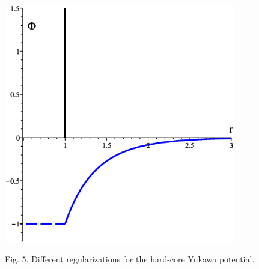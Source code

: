 \documentclass[8pt]{beamer}
\begin{document}
\begin{frame}
\begin{columns}
			\begin{column}{0.5\textwidth}
				\begin{figure}[htbp]
					\includegraphics[width=0.9\textwidth,angle=0]{hcy_wca} \\
					\parbox{0.8\textwidth}{\caption*{Fig. 5. Different regularizations for the hard-core Yukawa potential.
					}}
				\end{figure}
			\end{column}
			
		\end{columns}
		
	\end{frame}
	
\end{document}
